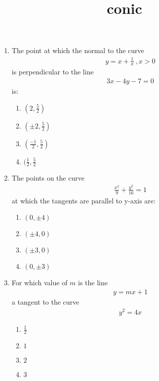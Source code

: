 \documentclass{article}
\title{conic}
\begin{document}
\begin{enumerate}
\item The point at which the normal to the curve 
	\begin{align}
		y = x+ \frac{1}{x} \: ,x>0 
	\end{align}
	 is perpendicular to the line 
		\begin{align}
			3x-4y-7 = 0 
		\end{align}
	is:
\begin{enumerate}[label=(\alph*)]
\item $(2,\frac{5}{2})$
\item $(\pm{2},\frac{5}{2})$
\item $(\frac{-1}{2},\frac{5}{2})$
\item $(\frac{1}{2},\frac{5}{2}$
\end{enumerate}
\item The points on the curve 
	\begin{align}
		\frac{x^2}{9} + \frac{y^2}{16} = 1
	\end{align}
	at which the tangents are parallel to y-axis are:
	\begin{enumerate}[label=(\alph*)]
		\item $(0,\pm{4})$
		\item $(\pm{4},0)$
		\item $(\pm{3},0)$
		\item $(0,\pm{3})$
	\end{enumerate}
\item For which value of $m$ is the line 
	\begin{align}
		y = mx +1
	\end{align}
	a tangent to the curve 
		\begin{align}
			y^2= 4x 
		\end{align}
	\begin{enumerate}[label=(\alph*)]
		\item $\frac{1}{2}$
		\item $1$
		\item $2$
		\item $3$
	\end{enumerate}
\end{enumerate}
\end{document}
